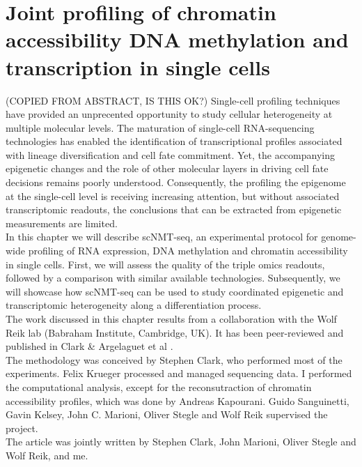 \chapter{Joint profiling of chromatin accessibility DNA methylation and transcription in single cells}
\graphicspath{{Chapter1/Figs/}}

(COPIED FROM ABSTRACT, IS THIS OK?) Single-cell profiling techniques have provided an unprecented opportunity to study cellular heterogeneity at multiple molecular levels. The maturation of single-cell RNA-sequencing technologies has enabled the identification of transcriptional profiles associated with lineage diversification and cell fate commitment. Yet, the accompanying epigenetic changes and the role of other molecular layers in driving cell fate decisions remains poorly understood. Consequently, the profiling the epigenome at the single-cell level is receiving increasing attention, but without associated transcriptomic readouts, the conclusions that can be extracted from epigenetic measurements are limited.\\

In this chapter we will describe scNMT-seq, an experimental protocol for genome-wide profiling of RNA expression, DNA methylation and chromatin accessibility in single cells. First, we will assess the quality of the triple omics readouts, followed by a comparison with similar available technologies. Subsequently, we will showcase how scNMT-seq can be used to study coordinated epigenetic and transcriptomic heterogeneity along a differentiation process. \\

The work discussed in this chapter results from a collaboration with the Wolf Reik lab (Babraham Institute, Cambridge, UK). It has been peer-reviewed and published in Clark \& Argelaguet et al \cite{Clark2018}.\\
The methodology was conceived by Stephen Clark, who performed most of the experiments. Felix Krueger processed and managed sequencing data. I performed the computational analysis, except for the reconsutraction of chromatin accessibility profiles, which was done by Andreas Kapourani. Guido Sanguinetti, Gavin Kelsey, John C. Marioni, Oliver Stegle and Wolf Reik supervised the project.\\
The article was jointly written by Stephen Clark, John Marioni, Oliver Stegle and Wolf Reik, and me.

